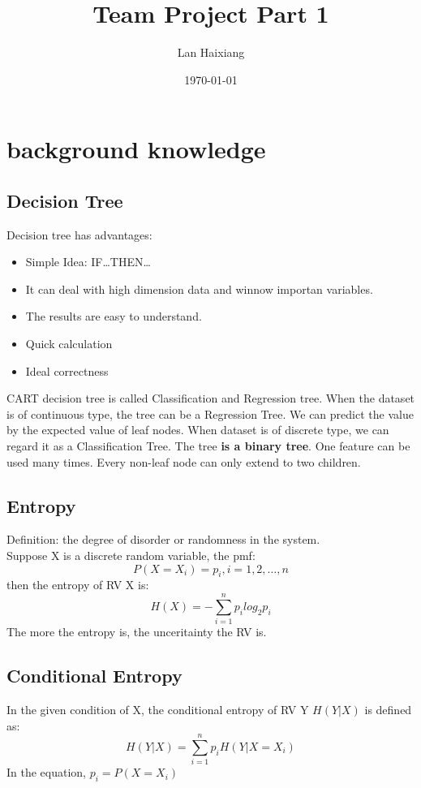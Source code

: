 \documentclass[50pt]{article}
\author{Lan Haixiang}
\title{Team Project Part 1}
\date{\today}
\begin{document}
\maketitle

\clearpage
\tableofcontents
\section{background knowledge}
\subsection{Decision Tree}
Decision tree has advantages:
\begin{itemize}
    \item Simple Idea: IF\dots THEN\dots
    \item It can deal with high dimension data and winnow importan variables.
    \item The results are easy to understand.
    \item Quick calculation
    \item Ideal correctness
\end{itemize}
CART decision tree is called Classification and Regression tree. When the dataset is of 
continuous type, the tree can be a Regression Tree. We can predict the value
by the expected value of leaf nodes. When dataset is of discrete type, we can regard it
as a Classification Tree. The tree \textbf{is a binary tree}. One feature can
be used many times. Every non-leaf node can only extend to two children.

\subsection{Entropy}
    Definition: the degree of disorder or randomness in the system.\\
    Suppose X is a discrete random variable, the pmf:
    $$P(X = X_i) = p_i, i = 1, 2, \dots, n$$
    then the entropy of RV X is:
    $$H(X) = -\sum_{i=1}^{n}p_{i}log_{2}{p_i}$$
    The more the entropy is, the unceritainty the RV is.
\subsection{Conditional Entropy}
    In the given condition of X, the conditional entropy of RV Y $H(Y|X)$ is defined as:
    $$H(Y|X) = \sum_{i=1}^{n}p_{i}H(Y|X=X_{i})$$
    In the equation, $p_{i} = P(X=X_{i})$
\end{document}
